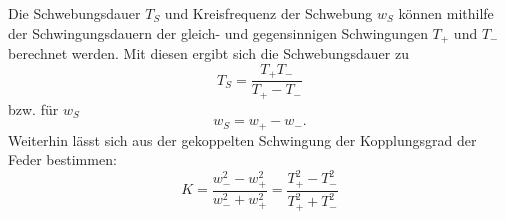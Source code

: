 \begin{itemize}
Die Schwebungsdauer $T_S$ und Kreisfrequenz der Schwebung $w_S$ können mithilfe der Schwingungsdauern der gleich- und gegensinnigen Schwingungen $T_+$ und $T_-$ berechnet werden. Mit diesen ergibt sich die Schwebungsdauer zu
\begin{equation}
T_S=\frac{T_+T_-}{T_+-T_-}
\end{equation}
bzw. für $w_S$
\begin{equation}
w_S=w_+-w_-.
\end{equation}
Weiterhin lässt sich aus der gekoppelten Schwingung der Kopplungsgrad der Feder bestimmen:
\begin{equation}
K=\frac{w_-^2-w_+^2}{w_-^2+w_+^2}=\frac{T_+^2-T_-^2}{T_+^2+T_-^2}
\end{equation}
\end{itemize}

